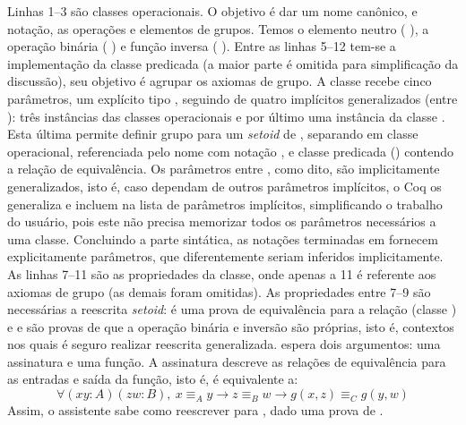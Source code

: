 Linhas 1--3 são classes operacionais. O objetivo é dar um nome canônico, e notação, as operações e elementos de grupos. Temos o elemento neutro (  ), a operação binária (  \coqinline{+}) e função inversa (  \coqinline{-}). Entre as linhas 5--12 tem-se a implementação da classe predicada  (a maior parte é omitida para simplificação da discussão), seu objetivo é agrupar os axiomas de grupo. A classe recebe cinco parâmetros, um explícito tipo , seguindo de quatro implícitos generalizados (entre ): três instâncias das classes operacionais e por último uma instância da classe . Esta última permite definir grupo para um \textit{setoid} de , separando em classe operacional, referenciada pelo nome  com notação , e classe predicada () contendo a relação de equivalência. Os parâmetros entre , como dito, são implicitamente generalizados, isto é, caso dependam de outros parâmetros implícitos, o Coq os generaliza e incluem na lista de parâmetros implícitos, simplificando o trabalho do usuário, pois este não precisa memorizar todos os parâmetros necessários a uma classe. Concluindo a parte sintática, as notações terminadas em  fornecem explicitamente parâmetros, que diferentemente seriam inferidos implicitamente. As linhas 7--11 são as propriedades da classe, onde apenas a 11 é referente aos axiomas de grupo (as demais foram omitidas). As propriedades entre 7--9 são necessárias a reescrita \textit{setoid}:  é uma prova de equivalência para a relação  (classe ) e  e  são provas de que a operação binária e inversão são próprias, isto é, contextos nos quais é seguro realizar reescrita generalizada.  espera dois argumentos: uma assinatura e uma função. A assinatura descreve as relações de equivalência para as entradas e saída da função, isto é,  é equivalente a:
\begin{equation*}\label{eq:proper}
	\forall (x y : A) (z w : B),~x \equiv_A y \rightarrow z \equiv_B w \rightarrow g(x,z) \equiv_C g(y,w)
\end{equation*}
Assim, o assistente sabe como reescrever  para , dado uma prova de . 

